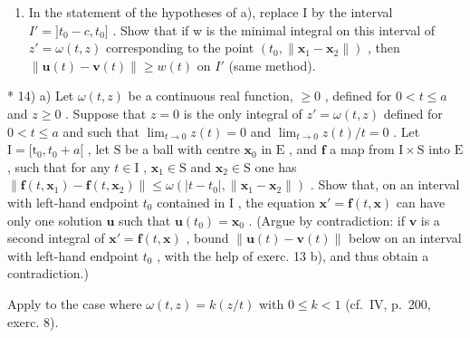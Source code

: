 \begin{enumerate}
\def\labelenumi{\alph{enumi})}
\setcounter{enumi}{1}
\tightlist
\item
  In the statement of the hypotheses of a), replace I by the interval \(I' = ]t_{0} - c, t_{0}]\) . Show that if w is the minimal integral on this interval of \(z' = \omega(t, z)\) corresponding to the point \((t_{0}, \| \mathbf{x}_{1} - \mathbf{x}_{2}\|)\) , then \(\| \mathbf{u}(t) - \mathbf{v}(t) \| \geqslant w(t)\) on \(I'\) (same method).
\end{enumerate}

* 14) a) Let \(\omega(t,z)\) be a continuous real function, \(\geqslant 0\) , defined for \(0 < t \leqslant a\) and \(z \geqslant 0\) . Suppose that \(z = 0\) is the only integral of \(z' = \omega(t,z)\) defined for \(0 < t \leqslant a\) and such that \(\lim_{t \to 0} z(t) = 0\) and \(\lim_{t \to 0} z(t)/t = 0\) . Let \(\mathrm{I} = [\mathrm{t}_0, t_0 + a[\) , let \(\mathrm{S}\) be a ball with centre \(\mathbf{x}_0\) in \(\mathrm{E}\) , and \(\mathbf{f}\) a map from \(\mathrm{I} \times \mathrm{S}\) into \(\mathrm{E}\) , such that for any \(t \in \mathrm{I}\) , \(\mathbf{x}_1 \in \mathrm{S}\) and \(\mathbf{x}_2 \in \mathrm{S}\) one has \(\|\mathbf{f}(t, \mathbf{x}_1) - \mathbf{f}(t, \mathbf{x}_2)\| \leqslant \omega(|t - t_0|, \| \mathbf{x}_1 - \mathbf{x}_2 \|)\) . Show that, on an interval with left-hand endpoint \(t_0\) contained in \(\mathrm{I}\) , the equation \(\mathbf{x}' = \mathbf{f}(t, \mathbf{x})\) can have only one solution \(\mathbf{u}\) such that \(\mathbf{u}(t_0) = \mathbf{x}_0\) . (Argue by contradiction: if \(\mathbf{v}\) is a second integral of \(\mathbf{x}' = \mathbf{f}(t, \mathbf{x})\) , bound \(\|\mathbf{u}(t) - \mathbf{v}(t)\|\) below on an interval with left-hand endpoint \(t_0\) , with the help of exerc. 13 b), and thus obtain a contradiction.)

Apply to the case where \(\omega(t, z) = k(z/t)\) with \(0 \leqslant k < 1\) (cf.~IV, p.~200, exerc. 8).


